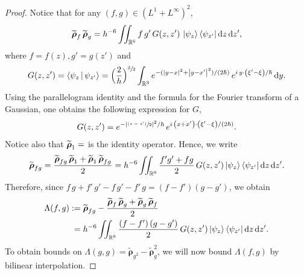 \documentclass[11pt]{article}
\makeatletter
\newcommand{\psfrac}[2]{\sfrac{(#1)}{#2}}
\newcommand {\an}[1] {\lvert #1\rvert}
\DeclareRobustCommand{\mathbbm}[1]{\csname jepbb@#1\endcsname}
\let\mathds\mathbbm
\theoremstyle{definition}
\newcommand {\RR} {\mathbb R}
\newcommand {\Rd} {\RR^3}
\newcommand {\RRd} {\RR^6}
\let\lt\left
\let\rt\right
\renewcommand {\(} {\lt(}
\renewcommand {\)} {\rt)}
\newcommand {\n}[1] {\lt\lvert #1 \rt\rvert}
\renewcommand {\d} {\mathop{}\!\mathrm{d}}
\newcommand {\intd} {\int_{\Rd}}
\newcommand {\iintd} {\iint_{\RRd}}
\newcommand {\Inprod}[2] {\Braket{#1 | #2}}
\newcommand {\op} {\boldsymbol{\rho}}
\makeatother
\begin{document}
\begin{proof}
Notice that for any $(f,g)\in (L^1+ L^\infty)^2$,
\begin{equation*}
\widetilde{\op}_{f}\,\widetilde{\op}_{g} = h^{-6} \iintd f\,g' \,G(z,z') \, \ket{\psi_{z}}\bra{\psi_{z'}} \d z \d z',
\end{equation*}
where $f = f(z), g' = g(z')$ and
\begin{equation*}
G(z,z') = \Inprod{\psi_z}{\psi_{z'}} = \Bigl(\frac{2}{h}\Bigr)^{\sfrac32} \intd e^{-(\n{y-x}^2+\n{y-x'}^2)/(2\hbar)}\, e^{i\,y\cdot\(\xi'-\xi\)/\hbar} \d y.
\end{equation*}
Using the parallelogram identity and the formula for the Fourier transform of a Gaussian, one obtains the following expression for $G$,
\begin{equation*}
G(z,z')
= e^{-\an{\psfrac{z-z'}{2}}^2/\hbar}\, e^{i\,\(x+x'\)\cdot\(\xi'-\xi\)/(2\hbar)}.
\end{equation*}
Notice also that $\widetilde{\op}_1 = \mathds{1}$ is the identity operator. Hence, we write
\[
\widetilde{\op}_{fg} = \frac{\widetilde{\op}_{fg}\, \widetilde{\op}_1 + \widetilde{\op}_1\, \widetilde{\op}_{fg}}{2} = h^{-6} \iintd \frac{f'g'+fg}{2} \,G(z,z') \ket{\psi_{z}}\bra{\psi_{z'}} \d z \d z'.
\]
Therefore, since $f\,g + f'\,g' - f\,g' - f'\,g = \(f-f'\) \(g-g'\)$, we obtain
\begin{align*}
\Lambda(f,g) &:= \widetilde{\op}_{fg} - \frac{\widetilde{\op}_f\,\widetilde{\op}_g + \widetilde{\op}_g\,\widetilde{\op}_f}{2}
\\
&\hphantom{:}= h^{-6} \iintd \frac{\(f-f'\)\(g-g'\)}{2} \,G(z,z') \ket{\psi_{z}}\bra{\psi_{z'}} \d z \d z'.
\end{align*}
To obtain bounds on $\Lambda(g,g) = \widetilde{\op}_{g^2} - \widetilde{\op}_g^2$, we will now bound $\Lambda(f,g)$ by bilinear interpolation.


\end{proof}
\end{document}
